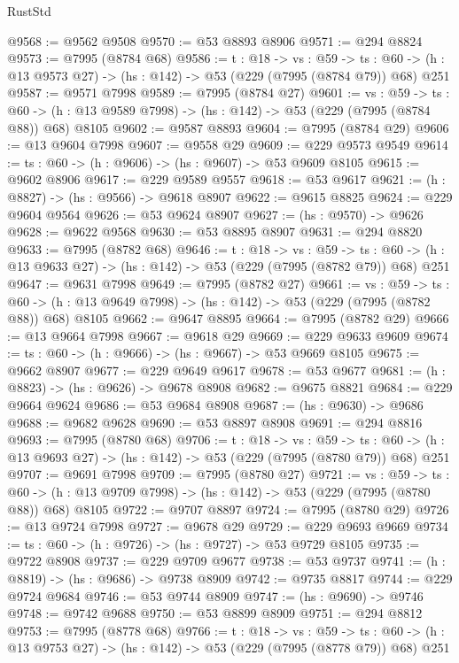 \begin{lexlean}{RustStd}
\begin{coremodule}
@9568 := @9562 @9508
@9570 := @53 @8893 @8906
@9571 := @294 @8824
@9573 := @7995 (@8784 @68)
@9586 := {t : @18} ->
  {vs : @59} ->
  {ts : @60} -> (h : @13 @9573 @27) -> (hs : @142) -> @53 (@229 (@7995 (@8784 @79)) @68) @251
@9587 := @9571 @7998
@9589 := @7995 (@8784 @27)
@9601 := {vs : @59} ->
  {ts : @60} -> (h : @13 @9589 @7998) -> (hs : @142) -> @53 (@229 (@7995 (@8784 @88)) @68) @8105
@9602 := @9587 @8893
@9604 := @7995 (@8784 @29)
@9606 := @13 @9604 @7998
@9607 := @9558 @29
@9609 := @229 @9573 @9549
@9614 := {ts : @60} -> (h : @9606) -> (hs : @9607) -> @53 @9609 @8105
@9615 := @9602 @8906
@9617 := @229 @9589 @9557
@9618 := @53 @9617
@9621 := (h : @8827) -> (hs : @9566) -> @9618 @8907
@9622 := @9615 @8825
@9624 := @229 @9604 @9564
@9626 := @53 @9624 @8907
@9627 := (hs : @9570) -> @9626
@9628 := @9622 @9568
@9630 := @53 @8895 @8907
@9631 := @294 @8820
@9633 := @7995 (@8782 @68)
@9646 := {t : @18} ->
  {vs : @59} ->
  {ts : @60} -> (h : @13 @9633 @27) -> (hs : @142) -> @53 (@229 (@7995 (@8782 @79)) @68) @251
@9647 := @9631 @7998
@9649 := @7995 (@8782 @27)
@9661 := {vs : @59} ->
  {ts : @60} -> (h : @13 @9649 @7998) -> (hs : @142) -> @53 (@229 (@7995 (@8782 @88)) @68) @8105
@9662 := @9647 @8895
@9664 := @7995 (@8782 @29)
@9666 := @13 @9664 @7998
@9667 := @9618 @29
@9669 := @229 @9633 @9609
@9674 := {ts : @60} -> (h : @9666) -> (hs : @9667) -> @53 @9669 @8105
@9675 := @9662 @8907
@9677 := @229 @9649 @9617
@9678 := @53 @9677
@9681 := (h : @8823) -> (hs : @9626) -> @9678 @8908
@9682 := @9675 @8821
@9684 := @229 @9664 @9624
@9686 := @53 @9684 @8908
@9687 := (hs : @9630) -> @9686
@9688 := @9682 @9628
@9690 := @53 @8897 @8908
@9691 := @294 @8816
@9693 := @7995 (@8780 @68)
@9706 := {t : @18} ->
  {vs : @59} ->
  {ts : @60} -> (h : @13 @9693 @27) -> (hs : @142) -> @53 (@229 (@7995 (@8780 @79)) @68) @251
@9707 := @9691 @7998
@9709 := @7995 (@8780 @27)
@9721 := {vs : @59} ->
  {ts : @60} -> (h : @13 @9709 @7998) -> (hs : @142) -> @53 (@229 (@7995 (@8780 @88)) @68) @8105
@9722 := @9707 @8897
@9724 := @7995 (@8780 @29)
@9726 := @13 @9724 @7998
@9727 := @9678 @29
@9729 := @229 @9693 @9669
@9734 := {ts : @60} -> (h : @9726) -> (hs : @9727) -> @53 @9729 @8105
@9735 := @9722 @8908
@9737 := @229 @9709 @9677
@9738 := @53 @9737
@9741 := (h : @8819) -> (hs : @9686) -> @9738 @8909
@9742 := @9735 @8817
@9744 := @229 @9724 @9684
@9746 := @53 @9744 @8909
@9747 := (hs : @9690) -> @9746
@9748 := @9742 @9688
@9750 := @53 @8899 @8909
@9751 := @294 @8812
@9753 := @7995 (@8778 @68)
@9766 := {t : @18} ->
  {vs : @59} ->
  {ts : @60} -> (h : @13 @9753 @27) -> (hs : @142) -> @53 (@229 (@7995 (@8778 @79)) @68) @251

\end{coremodule}
\end{lexlean}
